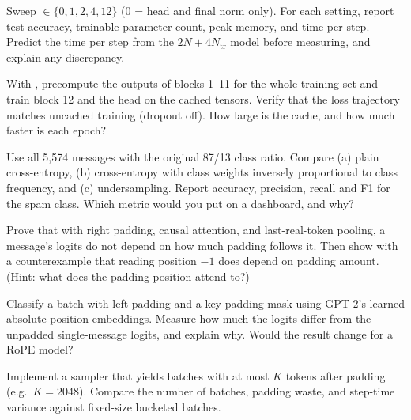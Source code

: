 \begin{exercise}\label{ex:classify:layers}
Sweep $\in\{0,1,2,4,12\}$ (0 = head and final norm only). For
each setting, report test accuracy, trainable parameter count, peak memory, and
time per step. Predict the time per step from the $2N + 4N_{\text{tr}}$ model before
measuring, and explain any discrepancy.
\end{exercise}

\begin{exercise}
With , precompute the outputs of blocks 1--11 for the whole
training set and train block 12 and the head on the cached tensors. Verify that the
loss trajectory matches uncached training (dropout off). How large is the cache, and
how much faster is each epoch?
\end{exercise}

\begin{exercise}
Use all 5{,}574 messages with the original 87/13 class ratio. Compare (a) plain
cross-entropy, (b) cross-entropy with class weights inversely proportional to class
frequency, and (c) undersampling. Report accuracy, precision, recall and F1 for the
spam class. Which metric would you put on a dashboard, and why?
\end{exercise}

\begin{exercise}
Prove that with right padding, causal attention, and last-real-token pooling, a
message's logits do not depend on how much padding follows it. Then show with a
counterexample that reading position $-1$ does depend on padding amount. (Hint: what
does the padding position attend to?)
\end{exercise}

\begin{exercise}
Classify a batch with left padding and a key-padding mask using GPT-2's learned
absolute position embeddings. Measure how much the logits differ from the unpadded
single-message logits, and explain why. Would the result change for a RoPE model?
\end{exercise}

\begin{exercise}
Implement a sampler that yields batches with at most $K$ tokens after padding (e.g.\
$K=2048$). Compare the number of batches, padding waste, and step-time variance against
fixed-size bucketed batches.
\end{exercise}

